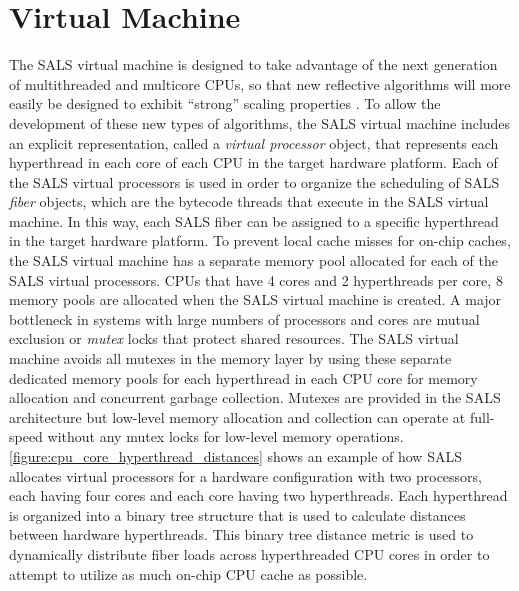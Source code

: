 \section{Virtual Machine}

The SALS virtual machine is designed to take advantage of the next
generation of multithreaded and multicore CPUs, so that new reflective
algorithms will more easily be designed to exhibit ``strong'' scaling
properties \cite[]{sodan:2010}.  To allow the development of these new
types of algorithms, the SALS virtual machine includes an explicit
representation, called a {\emph{virtual processor}} object, that
represents each hyperthread in each core of each CPU in the target
hardware platform.  Each of the SALS virtual processors is used in
order to organize the scheduling of SALS {\emph{fiber}} objects, which
are the bytecode threads that execute in the SALS virtual machine.  In
this way, each SALS fiber can be assigned to a specific hyperthread in
the target hardware platform.  To prevent local cache misses for
on-chip caches, the SALS virtual machine has a separate memory pool
allocated for each of the SALS virtual processors.  CPUs that have 4
cores and 2 hyperthreads per core, 8 memory pools are allocated when
the SALS virtual machine is created.  A major bottleneck in systems
with large numbers of processors and cores are mutual exclusion or
{\emph{mutex}} locks that protect shared resources.  The SALS virtual
machine avoids all mutexes in the memory layer by using these separate
dedicated memory pools for each hyperthread in each CPU core for
memory allocation and concurrent garbage collection.  Mutexes are
provided in the SALS architecture but low-level memory allocation and
collection can operate at full-speed without any mutex locks for
low-level memory operations.
{\mbox{\autoref{figure:cpu_core_hyperthread_distances}}} shows an
example of how SALS allocates virtual processors for a hardware
configuration with two processors, each having four cores and each
core having two hyperthreads.  Each hyperthread is organized into a
binary tree structure that is used to calculate distances between
hardware hyperthreads.  This binary tree distance metric is used to
dynamically distribute fiber loads across hyperthreaded CPU cores in
order to attempt to utilize as much on-chip CPU cache as possible.
